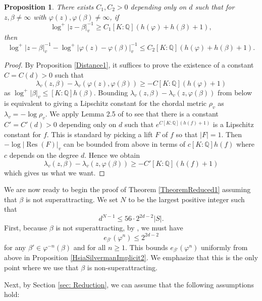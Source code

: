 \documentclass[10pt, reqno]{amsart}
\newcommand{\bb}{\mathbb}
\newcommand{\vphi}{\varphi}
\newcommand{\Res}{\operatorname{Res}}
\numberwithin{theorem}{section}
\newtheorem{proposition}[theorem]{Proposition}
\numberwithin{equation}{section}
\numberwithin{example}{section}
\numberwithin{definition}{section}
\begin{document}
\begin{proposition} \label{Distance2}
There exists $C_1,C_2 > 0$ depending only on $d$ such that for $z,\beta \not = \infty$ with $\vphi(z), \vphi(\beta) \not = \infty$, if 
$$\log^+|z-\beta|^{-1}_v \geq C_1[K:\bb{Q}](h(\vphi) + h(\beta)+1),$$
then 
$$\log^+|z-\beta|^{-1}_v -  \log^+|\vphi(z) - \vphi(\beta)|^{-1}_v  \leq C_2[K:\bb{Q}](h(\vphi) + h(\beta)+1).$$
\end{proposition}

\begin{proof}
By Proposition \ref{Distance1}, it suffices to prove the existence of a constant $C = C(d) > 0$ such that 
$$\lambda_v(z,\beta) - \lambda_v(\vphi(z),\vphi(\beta)) \geq -C[K:\bb{Q}](h(\vphi)+1)$$
 as $\log^+|\beta|_v \leq [K:\bb{Q}]h(\beta)$. Bounding $\lambda_v(z,\beta) - \lambda_v(z,\vphi(\beta))$
from below is equivalent to giving a Lipschitz constant for the chordal metric $\rho_v$ as $\lambda_v = - \log \rho_v$. We apply Lemma 2.5 of \cite{GOV20} to see that there is a constant $C' = C'(d) > 0$ depending only on $d$ such that 
$e^{C[K:\bb{Q}](h(f)+1)}$ is a Lipschitz constant for $f$. This is standard by picking a lift $F$ of $f$ so that $|F| = 1$. Then $-\log |\Res(F)|_v$ can be bounded from above in terms of $c [K:\bb{Q}]h(f)$ where $c$ depends on the degree $d$. Hence we obtain 
$$\lambda_v(z,\beta) - \lambda_v(z,\vphi(\beta)) \geq -C' [K:\bb{Q}](h(f)+1)$$
which gives us what we want.
\end{proof}

We are now ready to begin the proof of Theorem \ref{TheoremReduced1} assuming that $\beta$ is not superattracting. We set $N$ to be the largest positive integer such that 
$$d^{N-1} \leq 56 \cdot 2^{2d-2} |S|.$$
First, because $\beta$ is not superattracting, by \cite[Lemma 4.3]{Sil93}, we must have 
$$e_{\beta'}(\vphi^n) \leq 2^{2d-2}$$
for any $\beta' \in \vphi^{-n}(\beta)$ and for all $n \geq 1$. This bounds $e_{\beta'}(\vphi^n)$ uniformly from above in Proposition \ref{HsiaSilvermanImplicit2}. We emphasize that this is the only point where we use that $\beta$ is non-superattracting. 
\par 
Next, by Section \ref{sec: Reduction}, we can assume that the following assumptions hold:
\end{document}
